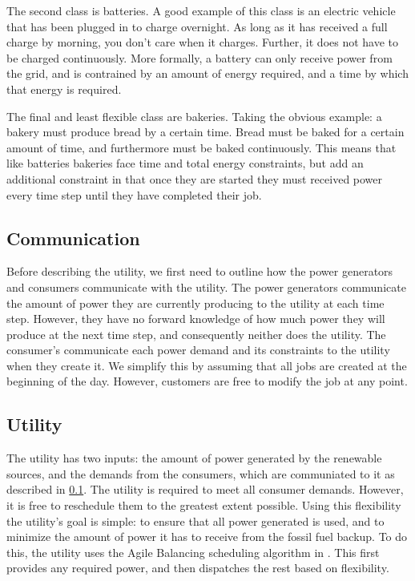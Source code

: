 \documentclass[conference]{IEEEtran}
\begin{document}
The second class is batteries. A good example of this class is an electric vehicle that has been plugged in to charge overnight. As long as it has received a full charge by morning, you don't care when it charges. Further, it does not have to be charged continuously. More formally, a battery can only receive power from the grid, and is contrained by an amount of energy required, and a time by which that energy is required.

The final and least flexible class are bakeries. Taking the obvious example: a bakery must produce bread by a certain time. Bread must be baked for a certain amount of time, and furthermore must be baked continuously. This means that like batteries bakeries face time and total energy constraints, but add an additional constraint in that once they are started they must received power every time step until they have completed their job.

\subsection{Communication}
\label{Communication}

Before describing the utility, we first need to outline how the power generators and consumers communicate with the utility. The power generators communicate the amount of power they are currently producing to the utility at each time step. However, they have no forward knowledge of how much power they will produce at the next time step, and consequently neither does the utility. The consumer's communicate each power demand and its constraints to the utility when they create it. We simplify this by assuming that all jobs are created at the beginning of the day. However, customers are free to modify the job at any point.

\subsection{Utility}
\label{Utility}

The utility has two inputs: the amount of power generated by the renewable sources, and the demands from the consumers, which are communiated to it as described in \ref{Communication}. The utility is required to meet all consumer demands. However, it is free to reschedule them to the greatest extent possible. Using this flexibility the utility's goal is simple: to ensure that all power generated is used, and to minimize the amount of power it has to receive from the fossil fuel backup. To do this, the utility uses the Agile Balancing scheduling algorithm in \cite{petersen2013taxonomy}. This first provides any required power, and then dispatches the rest based on flexibility.
\end{document}
